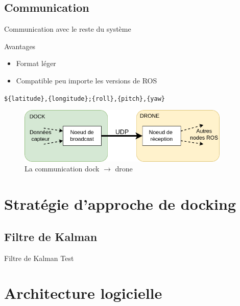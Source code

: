\documentclass[pdftex,beamer,aspectratio=169]{beamer}
\theoremstyle{definition}
\theoremstyle{example}
\theoremstyle{plain}
\begin{document}
\subsection{Communication}

\begin{frame}[fragile]{Communication avec le reste du système}
  \centering
  \begin{minipage}{0.3\textwidth}
    \begin{exampleblock}{Avantages}
      \begin{itemize}
        \item Format léger
        \item Compatible peu importe les versions de ROS
      \end{itemize}
    \end{exampleblock}
  \end{minipage}
  \begin{minipage}{0.69\textwidth}
    \verb|${latitude},{longitude};{roll},{pitch},{yaw}|
  
    \begin{figure}[H]
      \centering
      \includegraphics[width=0.9\textwidth]{UDP_connexion.png}
      \caption{La communication dock $\rightarrow$ drone}
  \end{figure}

  \end{minipage}
\end{frame}

\section{Stratégie d'approche de docking}
\subsection{Filtre de Kalman}
\begin{frame}[fragile]{Filtre de Kalman}
  Test
\end{frame}

\section{Architecture logicielle}
\end{document}
